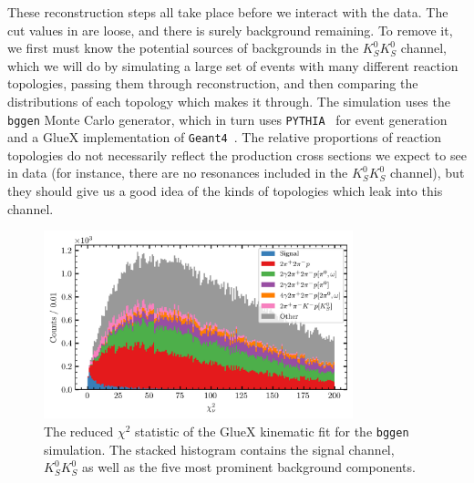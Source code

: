 These reconstruction steps all take place before we interact with the data. The cut values in  are loose, and there is surely background remaining. To remove it, we first must know the potential sources of backgrounds in the $K_S^0K_S^0$ channel, which we will do by simulating a large set of events with many different reaction topologies, passing them through reconstruction, and then comparing the distributions of each topology which makes it through. The simulation uses the \texttt{bggen} Monte Carlo generator, which in turn uses \texttt{PYTHIA}~\cite{Bierlich2022} for event generation and a GlueX implementation of \texttt{Geant4}~\cite{Allison2006,Allison2016,Agostinelli2003}. The relative proportions of reaction topologies do not necessarily reflect the production cross sections we expect to see in data (for instance, there are no resonances included in the $K_S^0K_S^0$ channel), but they should give us a good idea of the kinds of topologies which leak into this channel.

\begin{figure}
  \begin{center}
    \includegraphics[width=0.8\textwidth]{figures/bggen_chisqdof.png}
  \end{center}
  \caption{The reduced $\chi^2$ statistic of the GlueX kinematic fit for the \texttt{bggen} simulation. The stacked histogram contains the signal channel, $K_S^0K_S^0$ as well as the five most prominent background components.}\label{fig:bggen-chisqdof}
\end{figure}

